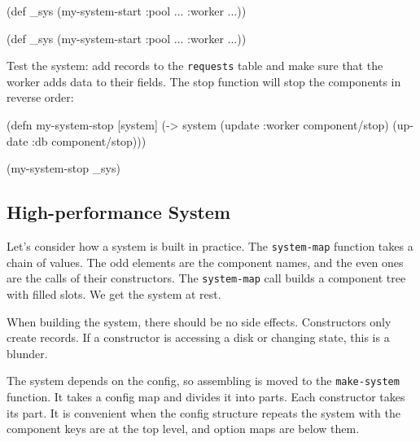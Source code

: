 \begin{english}
  \begin{clojure}
(def _sys
  (my-system-start
    {:pool {...} :worker {...}}))
  \end{clojure}
\end{english}

\else

\begin{english}
  \begin{clojure}
(def _sys (my-system-start {:pool {...} :worker {...}}))
  \end{clojure}
\end{english}

\fi

Test the system: add records to the \verb|requests| table and make sure that the worker adds data to their fields. The stop function will stop the components in reverse order:

\begin{english}
  \begin{clojure}
(defn my-system-stop
  [system]
  (-> system
      (update :worker component/stop)
      (update :db component/stop)))

(my-system-stop _sys)
  \end{clojure}
\end{english}

\subsection{High-performance System}


Let's consider how a system is built in practice. The \verb|system-map| function takes a chain of values. The odd elements are the component names, and the even ones are the calls of their constructors. The \verb|system-map| call builds a component tree with filled slots. We get the system at rest.


When building the system, there should be no side effects. Constructors only create records. If a constructor is accessing a disk or changing state, this is a blunder.

The system depends on the config, so assembling is moved to the \verb|make-system| function. It takes a config map and divides it into parts. Each constructor takes its part. It is convenient when the config structure repeats the system with the component keys are at the top level, and option maps are below them.

